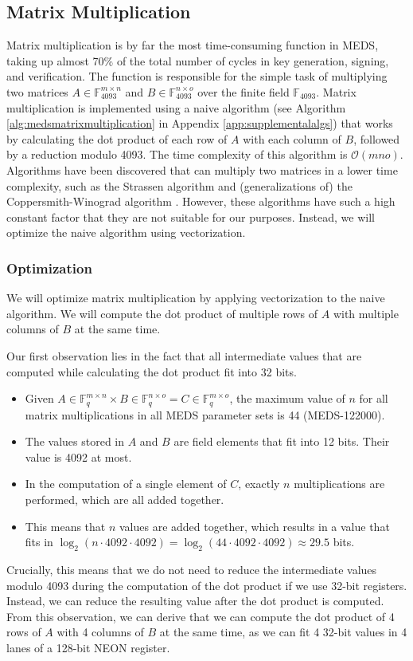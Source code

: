 \documentclass[11pt,a4paper]{report}
\theoremstyle{definition}
\begin{document}
\subsection{Matrix Multiplication}
\label{sec:matrixmultiplication}
Matrix multiplication is by far the most time-consuming function in MEDS, taking up almost 70\% of the total number of cycles in key generation, signing, and verification. The function is responsible for the simple task of multiplying two matrices $A \in \mathbb{F}_{4093}^{m \times n}$ and $B \in \mathbb{F}_{4093}^{n \times o}$ over the finite field $\mathbb{F}_{4093}$. Matrix multiplication is implemented using a naive algorithm (see Algorithm \ref{alg:medsmatrixmultiplication} in Appendix \ref{app:supplementalalgs}) that works by calculating the dot product of each row of $A$ with each column of $B$, followed by a reduction modulo 4093. The time complexity of this algorithm is $\mathcal{O}(mno)$. Algorithms have been discovered that can multiply two matrices in a lower time complexity, such as the Strassen algorithm \cite{strassen1969gaussian} and (generalizations of) the Coppersmith-Winograd algorithm \cite{coppersmith1987matrix}. However, these algorithms have such a high constant factor that they are not suitable for our purposes. Instead, we will optimize the naive algorithm using vectorization.

\subsubsection{Optimization}
\label{sec:matrixmultiplicationoptimization}
We will optimize matrix multiplication by applying vectorization to the naive algorithm. We will compute the dot product of multiple rows of $A$ with multiple columns of $B$ at the same time.

Our first observation lies in the fact that all intermediate values that are computed while calculating the dot product fit into 32 bits.
\begin{itemize}
  \item Given $A \in \mathbb{F}_q^{m \times n} \times B \in \mathbb{F}_q^{n \times o} = C \in \mathbb{F}_q^{m \times o}$, the maximum value of $n$ for all matrix multiplications in all MEDS parameter sets is 44 (MEDS-122000).
  \item The values stored in $A$ and $B$ are field elements that fit into 12 bits. Their value is 4092 at most.
  \item In the computation of a single element of $C$, exactly $n$ multiplications are performed, which are all added together.
  \item This means that $n$ values are added together, which results in a value that fits in $\log_2(n \cdot 4092 \cdot 4092) = \log_2(44 \cdot 4092 \cdot 4092) \approx 29.5$ bits.
\end{itemize}
Crucially, this means that we do not need to reduce the intermediate values modulo 4093 during the computation of the dot product if we use 32-bit registers. Instead, we can reduce the resulting value after the dot product is computed. From this observation, we can derive that we can compute the dot product of 4 rows of $A$ with 4 columns of $B$ at the same time, as we can fit 4 32-bit values in 4 lanes of a 128-bit NEON register.
\end{document}
